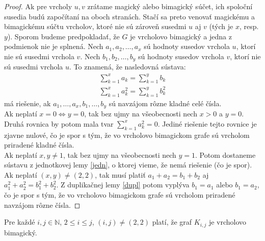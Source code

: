 \begin{proof} Ak pre vrcholy $u,v$ zrátame magický alebo bimagický súčet, ich spoloční susedia budú započítaní na oboch stranách. Stačí sa preto venovať magickému a bimagickému súčtu vrcholov, ktoré nie sú zároveň susedmi $u$ aj $v$ (tých je $x$, resp. $y$). Sporom budeme predpokladať, že $G$ je vrcholovo bimagický a jedna z podmienok nie je splnená. Nech $a_1, a_2, \dots, a_x$ sú hodnoty susedov vrchola $u$, ktorí nie sú susedmi vrchola $v$. Nech $b_1, b_2, \dots, b_y$ sú hodnoty susedov vrchola $v$, ktorí nie sú susedmi vrchola $u$. To znamená, že nasledovná sústava:
\begin{gather*}
\sum_{k=1}^{x} a_k = \sum_{k=1}^{y} b_k \\
\sum_{k=1}^{x} a^2_k = \sum_{k=1}^{y} b^2_k
\end{gather*}
má riešenie, ak $a_1, \dots , a_x, b_1, \dots , b_y$ sú navzájom rôzne kladné celé čísla. \\

Ak neplatí $x = 0 \iff y = 0$, tak bez ujmy na všeobecnosti nech $x > 0$ a $y = 0$. Druhá rovnica by potom mala tvar $\sum_{k=1}^{x} a^2_k = 0$. Jediné riešenie tejto rovnice je zjavne nulové, čo je spor s tým, že vo vrcholovo bimagickom grafe sú vrcholom priradené kladné čísla.  \\

Ak neplatí $x,y \neq 1$, tak bez ujmy na všeobecnosti nech $y = 1$. Potom dostaneme sústavu z jednotkovej lemy \ref{jedn}, o ktorej vieme, že nemá riešenie (čo je spor). \\

Ak neplatí $(x,y) \neq (2,2)$, tak musí platiť $a_1 + a_2 = b_1 + b_2$ aj $a^2_1 + a^2_2 = b^2_1 + b^2_2$. Z duplikačnej lemy \ref{dupl} potom vyplýva $b_1 = a_1$ alebo $b_1 = a_2$,  čo je spor s tým, že vo vrcholovo bimagickom grafe sú vrcholom priradené navzájom rôzne čísla.
\end{proof}

\begin{theorem}
\label{vbgkij}
Pre každé  $i,j \in \mathbb{N}$, $2 \leq i \leq j$, $(i, j) \neq (2, 2)$ platí, že graf $K_{i,j}$ je vrcholovo bimagický.
\end{theorem}

